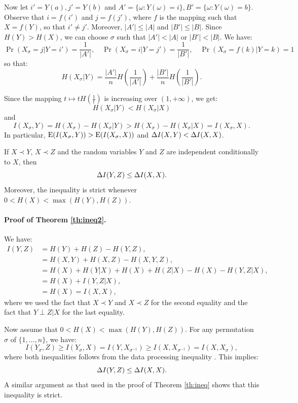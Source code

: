 Now let $i' = Y(a), j'= Y(b)$ and $A' = \{\omega: Y(\omega) = i\}, B'=\{\omega: Y(\omega) = b\}$. Observe that $i = f(i')$ and $j = f(j')$,  where $f$ is the mapping such that $X = f(Y)$, so that $i' \ne j'$. Moreover, $|A'| \le |A|$ and $|B'|\le |B|$. Since $H(Y) > H(X)$, we can choose $\sigma$ such that $|A'|< |A|$ or $|B'|<|B|$. We have:
$$
\Pr(X_\sigma=j | Y=i') =  \frac 1 {|A'|},\quad  \Pr(X_\sigma=i | Y=j') =  \frac 1 {|B'|}, \quad 
\Pr(X_\sigma=f(k) | Y=k) =  1
$$
so that:
$$
H(X_\sigma |Y)= \frac{|A'|}n  H\left( \frac 1 {|A'|}\right) + \frac{|B'|}n  H\left( \frac 1 {|B'|}\right).
$$

Since the mapping $t \mapsto t H\left(\frac 1 t\right)$ is  increasing over $(1,+\infty)$, we get:
$$
H(X_\sigma |Y) < H(X_\sigma |X)
$$
and
$$
I(X_\sigma,Y) = H(X_\sigma) -  H(X_\sigma |Y) > H(X_\sigma) -  H(X_\sigma |X) =   I(X_\sigma,X).
$$
In particular, ${\rm E}(I(X_\sigma, Y)) > {\rm E}(I(X_\sigma, X))$ and   $\Delta I(X,Y) < \Delta I(X,X)$.
\ep
\\


\begin{theorem}\label{th:ineq2}
	If $X\prec Y$, $X\prec Z$ and the random variables $Y$ and $Z$ are independent conditionally to $X$, then 
	$$ 
	\Delta I(Y, Z) \le \Delta I(X,X).$$
	Moreover, the inequality is strict whenever $0 < H(X) < \max(H(Y), H(Z))$.
\end{theorem}

\paragraph{Proof of Theorem \ref{th:ineq2}.}
We have:
\begin{align*}
I(Y,Z) &= H(Y) + H(Z) - H(Y,Z),\\
&= H(X, Y) + H(X, Z) - H(X, Y,Z),\\
&= H(X) + H(Y|X) +   H(X) + H(Z|X) -H(X) - H(Y, Z|X),\\
& =  H(X) +I(Y,Z|X),\\
&= H(X) = I(X,X),
\end{align*}
where we used the fact that $X\prec Y$ and $X\prec Z$  for the second equality and the fact that 
$Y\perp Z |X$ for the last equality.

Now assume that $0 < H(X) < \max(H(Y), H(Z))$.
For any permutation $\sigma$ of $\{1,\ldots,n\}$, we have:
$$%
I(Y_\sigma, Z)\ge I(Y_\sigma, X)= I(Y, X_{\sigma^{-1}}) \ge I(X, X_{\sigma^{-1}}) = I(X, X_{\sigma}),
$$%
where both inequalities follows from the data processing inequality \cite{cover}.
This implies:
$$
\Delta I(Y,Z) \le  \Delta I(X, X).
$$
A similar argument as that used in the proof of Theorem \ref{th:ineq} shows that this inequality is strict. 
\ep

